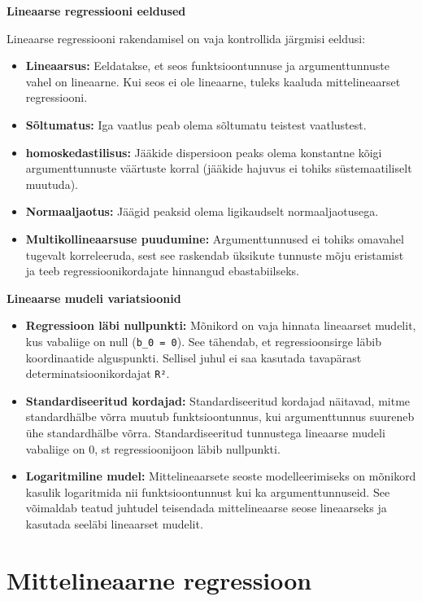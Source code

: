 \documentclass[
]{book}
\providecommand{\tightlist}{%
  \setlength{\itemsep}{0pt}\setlength{\parskip}{0pt}}
\theoremstyle{definition}
\theoremstyle{definition}
\theoremstyle{definition}
\theoremstyle{definition}
\theoremstyle{remark}
\begin{document}
\textbf{Lineaarse regressiooni eeldused}

Lineaarse regressiooni rakendamisel on vaja kontrollida järgmisi eeldusi:

\begin{itemize}
\tightlist
\item
  \textbf{Lineaarsus:} Eeldatakse, et seos funktsioontunnuse ja argumenttunnuste vahel on lineaarne. Kui seos ei ole lineaarne, tuleks kaaluda mittelineaarset regressiooni.
\item
  \textbf{Sõltumatus:} Iga vaatlus peab olema sõltumatu teistest vaatlustest.
\item
  \textbf{homoskedastilisus:} Jääkide dispersioon peaks olema konstantne kõigi argumenttunnuste väärtuste korral (jääkide hajuvus ei tohiks süstemaatiliselt muutuda).
\item
  \textbf{Normaaljaotus:} Jäägid peaksid olema ligikaudselt normaaljaotusega.
\item
  \textbf{Multikollineaarsuse puudumine:} Argumenttunnused ei tohiks omavahel tugevalt korreleeruda, sest see raskendab üksikute tunnuste mõju eristamist ja teeb regressioonikordajate hinnangud ebastabiilseks.
\end{itemize}

\textbf{Lineaarse mudeli variatsioonid}

\begin{itemize}
\tightlist
\item
  \textbf{Regressioon läbi nullpunkti:} Mõnikord on vaja hinnata lineaarset mudelit, kus vabaliige on null (\texttt{b\_0\ =\ 0}). See tähendab, et regressioonsirge läbib koordinaatide alguspunkti. Sellisel juhul ei saa kasutada tavapärast determinatsioonikordajat \texttt{R²}.
\item
  \textbf{Standardiseeritud kordajad:} Standardiseeritud kordajad näitavad, mitme standardhälbe võrra muutub funktsioontunnus, kui argumenttunnus suureneb ühe standardhälbe võrra. Standardiseeritud tunnustega lineaarse mudeli vabaliige on 0, st regressioonijoon läbib nullpunkti.
\item
  \textbf{Logaritmiline mudel:} Mittelineaarsete seoste modelleerimiseks on mõnikord kasulik logaritmida nii funktsioontunnust kui ka argumenttunnuseid. See võimaldab teatud juhtudel teisendada mittelineaarse seose lineaarseks ja kasutada seeläbi lineaarset mudelit.
\end{itemize}

\chapter{Mittelineaarne regressioon}\label{mittelineaarne-regressioon}
\end{document}
